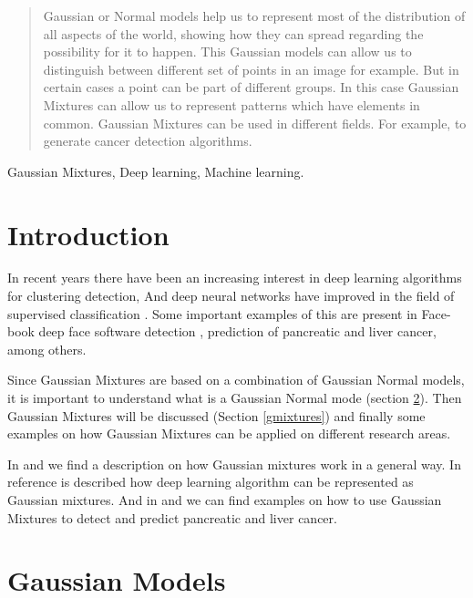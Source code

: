 \documentclass[conference]{IEEEtran}
\begin{document}
\begin{abstract}

Gaussian or Normal models help us to represent most of the distribution of all aspects of the world, showing how they can spread regarding the possibility for it to happen. This Gaussian models can allow us to distinguish between different set of points in an image for example. But in certain cases a point can be part of different groups. In this case Gaussian Mixtures can allow us to represent patterns which have elements in common. Gaussian Mixtures can be used in different fields. For example, to generate cancer detection algorithms.

\end{abstract}

\begin{IEEEkeywords}
Gaussian Mixtures, Deep learning, Machine learning.
\end{IEEEkeywords}

\section{Introduction}

In recent years there have been an increasing interest in deep learning algorithms for clustering detection, And deep neural networks have improved in the field of supervised classification \cite{deepgaussian}. Some important examples of this are present in Face-book deep face software detection \cite{deepgaussian}, prediction of pancreatic \cite{convolutional} and liver \cite{liver} cancer, among others.

Since Gaussian Mixtures are based on a combination of Gaussian Normal models, it is important to understand what is a Gaussian Normal mode (section \ref{normal_modes}). Then Gaussian Mixtures will be discussed (Section \ref{gmixtures}) and finally some examples on how Gaussian Mixtures can be applied on different research areas.

In \cite{aproxinter} and \cite{deepgaussian} we find a description on how Gaussian mixtures work in a general way. In reference \cite{random} is described how deep learning algorithm can be represented as Gaussian mixtures. And in \cite{convolutional} and \cite{liver} we can find examples on how to use Gaussian Mixtures to detect and predict pancreatic and liver cancer.

\section{Gaussian Models} \label{normal_modes}
\end{document}
